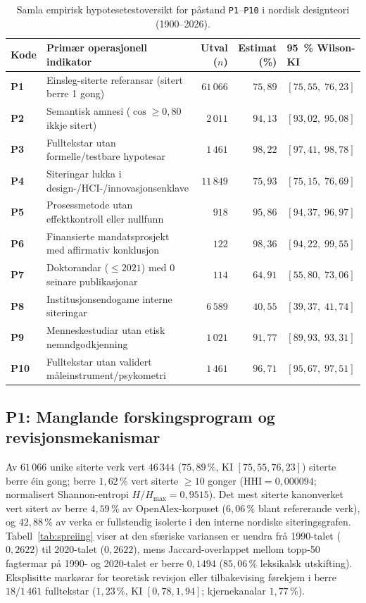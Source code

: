 \documentclass[11pt,a4paper]{article}
\begin{document}
\begin{table}[htbp]
\centering
\caption{Samla empirisk hypotesetestoversikt for påstand \texttt{P1}--\texttt{P10} i nordisk designteori (1900--2026).}
\label{tab:oversikt}
\footnotesize
\begin{tabular}{@{}llrrl@{}}
\toprule
\textbf{Kode} & \textbf{Primær operasjonell indikator} & \textbf{Utval ($n$)} & \textbf{Estimat (\%)} & \textbf{95~\% Wilson-KI} \\
\midrule
\textbf{P1} & Einsleg-siterte referansar (sitert berre 1 gong) & $61\,066$ & $75{,}89$ & $[75{,}55,\; 76{,}23]$ \\
\textbf{P2} & Semantisk amnesi ($\cos \ge 0{,}80$ ikkje sitert) & $2\,011$ & $94{,}13$ & $[93{,}02,\; 95{,}08]$ \\
\textbf{P3} & Fulltekstar utan formelle/testbare hypotesar & $1\,461$ & $98{,}22$ & $[97{,}41,\; 98{,}78]$ \\
\textbf{P4} & Siteringar lukka i design-/HCI-/innovasjonsenklave & $11\,849$ & $75{,}93$ & $[75{,}15,\; 76{,}69]$ \\
\textbf{P5} & Prosessmetode utan effektkontroll eller nullfunn & $918$ & $95{,}86$ & $[94{,}37,\; 96{,}97]$ \\
\textbf{P6} & Finansierte mandatsprosjekt med affirmativ konklusjon & $122$ & $98{,}36$ & $[94{,}22,\; 99{,}55]$ \\
\textbf{P7} & Doktorandar ($\le 2021$) med $0$ seinare publikasjonar & $114$ & $64{,}91$ & $[55{,}80,\; 73{,}06]$ \\
\textbf{P8} & Institusjonsendogame interne siteringar & $6\,589$ & $40{,}55$ & $[39{,}37,\; 41{,}74]$ \\
\textbf{P9} & Menneskestudiar utan etisk nemndgodkjenning & $1\,021$ & $91{,}77$ & $[89{,}93,\; 93{,}31]$ \\
\textbf{P10} & Fulltekstar utan validert måleinstrument/psykometri & $1\,461$ & $96{,}71$ & $[95{,}67,\; 97{,}51]$ \\
\bottomrule
\end{tabular}
\end{table}

\subsection{P1: Manglande forskingsprogram og revisjonsmekanismar}
Av $61\,066$ unike siterte verk vert $46\,344$ ($75{,}89\,\%$, KI $[75{,}55, 76{,}23]$) siterte berre éin gong; berre $1{,}62\,\%$ vert siterte $\ge 10$ gonger ($\mathrm{HHI} = 0{,}000094$; normalisert Shannon-entropi $H/H_{\max} = 0{,}9515$). Det mest siterte kanonverket \cite{sanders2008} vert sitert av berre $4{,}59\,\%$ av OpenAlex-korpuset ($6{,}06\,\%$ blant refererande verk), og $42{,}88\,\%$ av verka er fullstendig isolerte i den interne nordiske siteringsgrafen. Tabell~\ref{tab:spreiing} viser at den sfæriske variansen er uendra frå 1990-talet ($0{,}2622$) til 2020-talet ($0{,}2622$), mens Jaccard-overlappet mellom topp-50 fagtermar på 1990- og 2020-talet er berre $0{,}1494$ ($85{,}06\,\%$ leksikalsk utskifting). Eksplisitte markørar for teoretisk revisjon eller tilbakevising førekjem i berre $18/1\,461$ fulltekstar ($1{,}23\,\%$, KI $[0{,}78, 1{,}94]$; kjernekanalar $1{,}77\,\%$).
\end{document}
